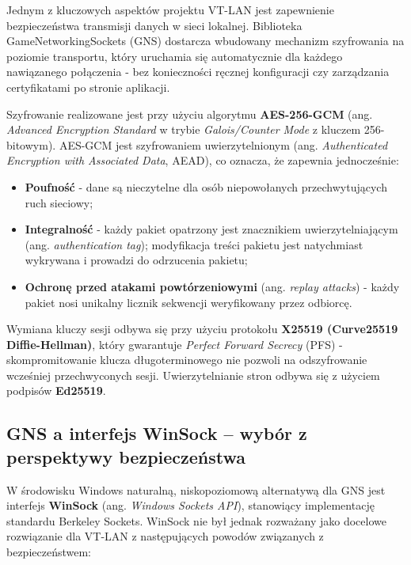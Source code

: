 Jednym z kluczowych aspektów projektu VT-LAN jest zapewnienie bezpieczeństwa
transmisji danych w sieci lokalnej. Biblioteka GameNetworkingSockets (GNS)
dostarcza wbudowany mechanizm szyfrowania na poziomie transportu, który
uruchamia się automatycznie dla każdego nawiązanego połączenia - bez
konieczności ręcznej konfiguracji czy zarządzania certyfikatami po stronie
aplikacji.

Szyfrowanie realizowane jest przy użyciu algorytmu \textbf{AES-256-GCM}
(ang. \textit{Advanced Encryption Standard} w trybie \textit{Galois/Counter Mode}
z kluczem 256-bitowym). AES-GCM jest szyfrowaniem uwierzytelnionym
(ang. \textit{Authenticated Encryption with Associated Data}, AEAD),
co oznacza, że zapewnia jednocześnie:

\begin{itemize}
    \item \textbf{Poufność} - dane są nieczytelne dla osób niepowołanych
    przechwytujących ruch sieciowy;
    \item \textbf{Integralność} - każdy pakiet opatrzony jest znacznikiem
    uwierzytelniającym (ang. \textit{authentication tag}); modyfikacja
    treści pakietu jest natychmiast wykrywana i prowadzi do odrzucenia
    pakietu;
    \item \textbf{Ochronę przed atakami powtórzeniowymi}
    (ang. \textit{replay attacks}) - każdy pakiet nosi unikalny licznik
    sekwencji weryfikowany przez odbiorcę.
\end{itemize}

Wymiana kluczy sesji odbywa się przy użyciu protokołu
\textbf{X25519 (Curve25519 Diffie-Hellman)}, który gwarantuje
\textit{Perfect Forward Secrecy} (PFS) - skompromitowanie klucza
długoterminowego nie pozwoli na odszyfrowanie wcześniej przechwyconych
sesji. Uwierzytelnianie stron odbywa się z użyciem podpisów
\textbf{Ed25519}.

\subsection*{GNS a interfejs WinSock -- wybór z perspektywy bezpieczeństwa}

W środowisku Windows naturalną, niskopoziomową alternatywą dla GNS jest
interfejs \textbf{WinSock} (ang. \textit{Windows Sockets API}), stanowiący
implementację standardu Berkeley Sockets. WinSock nie był jednak rozważany
jako docelowe rozwiązanie dla VT-LAN z następujących powodów związanych
z bezpieczeństwem:

